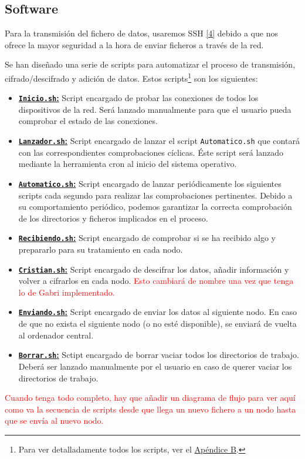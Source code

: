 \subsection{Software}
Para la transmisión del fichero de datos, usaremos SSH \hyperlink{4}{[4]} debido a que nos ofrece la mayor seguridad a la hora de enviar ficheros a través de la red.

Se han diseñado una serie de scripts para automatizar el proceso de transmisión, cifrado/descifrado y adición de datos. Estos scripts\footnote{Para ver detalladamente todos los scripts, ver el \hyperlink{Scripts}{Apéndice B}.} son los siguientes:
\begin{itemize}
	\item \hyperlink{ScriptConexion}{\textbf{\texttt{Inicio.sh}:}} Script encargado de probar las conexiones de todos los dispositivos de la red. Será lanzado manualmente para que el usuario pueda comprobar el estado de las conexiones.
	\item \hyperlink{ScriptLanzador}{\textbf{\texttt{Lanzador.sh}:}} Script encargado de lanzar el script \texttt{Automatico.sh} que contará con las correspondientes comprobaciones cíclicas. Éste script será lanzado mediante la herramienta cron al inicio del sistema operativo.
	\item \hyperlink{ScriptAutomatico}{\textbf{\texttt{Automatico.sh}:}} Script encargado de lanzar periódicamente los siguientes scripts cada segundo para realizar las comprobaciones pertinentes. Debido a su comportamiento periódico, podemos garantizar la correcta comprobación de los directorios y ficheros implicados en el proceso.
	\item \hyperlink{ScriptRecibiendo}{\textbf{\texttt{Recibiendo.sh}:}} Script encargado de comprobar si se ha recibido algo y prepararlo para su tratamiento en cada nodo.
	\item \hyperlink{ScriptCristian}{\textbf{\texttt{Cristian.sh}:}} Script encargado de descifrar los datos, añadir información y volver a cifrarlos en cada nodo. \textcolor{red}{Esto cambiará de nombre una vez que tenga lo de Gabri implementado.}
	\item \hyperlink{ScriptEnviando}{\textbf{\texttt{Enviando.sh}:}} Script encargado de enviar los datos al siguiente nodo. En caso de que no exista el siguiente nodo (o no esté disponible), se enviará de vuelta al ordenador central.
	\item \hyperlink{ScriptBorrar}{\textbf{\texttt{Borrar.sh}:}} Sctipt encargado de borrar vaciar todos los directorios de trabajo. Deberá ser lanzado manualmente por el usuario en caso de querer vaciar los directorios de trabajo.
\end{itemize}

\textcolor{red}{Cuando tenga todo completo, hay que añadir un diagrama de flujo para ver aquí como va la secuencia de scripts desde que llega un nuevo fichero a un nodo hasta que se envía al nuevo nodo.}